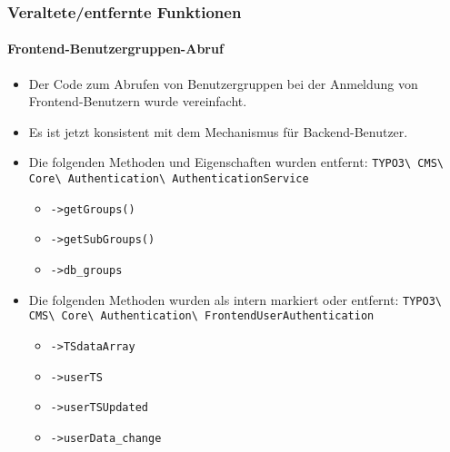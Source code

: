 %

\begin{frame}[fragile]
	\frametitle{Veraltete/entfernte Funktionen}
	\framesubtitle{Frontend-Benutzergruppen-Abruf}

	\begin{itemize}
		\item Der Code zum Abrufen von Benutzergruppen bei der Anmeldung von Frontend-Benutzern
			wurde vereinfacht.
		\item Es ist jetzt konsistent mit dem Mechanismus für Backend-Benutzer.
		\item Die folgenden Methoden und Eigenschaften wurden entfernt:\newline
			\smaller\texttt{TYPO3\textbackslash
				CMS\textbackslash
				Core\textbackslash
				Authentication\textbackslash
				AuthenticationService}\normalsize

			\begin{itemize}\smaller
				\item \texttt{->getGroups()}
				\item \texttt{->getSubGroups()}
				\item \texttt{->db\_groups}
			\end{itemize}\normalsize

		\item Die folgenden Methoden wurden als intern markiert oder entfernt:\newline
			\smaller\texttt{TYPO3\textbackslash
				CMS\textbackslash
				Core\textbackslash
				Authentication\textbackslash
				FrontendUserAuthentication}\normalsize

			\begin{itemize}\smaller
				\item \texttt{->TSdataArray}
				\item \texttt{->userTS}
				\item \texttt{->userTSUpdated}
				\item \texttt{->userData\_change}
			\end{itemize}\normalsize

	\end{itemize}

\end{frame}


